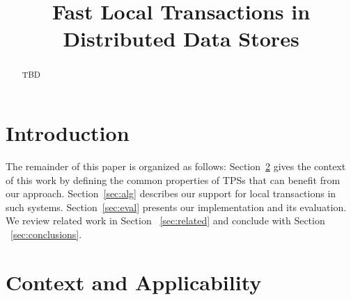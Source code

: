 \documentclass[preprint,10pt]{sigplanconf}
\begin{document}
\title{Fast Local Transactions in Distributed Data Stores}


\maketitle

\sloppy


\begin{abstract}
TBD
\end{abstract}


\section{Introduction} \label{sec:intro}


The remainder of this paper is organized as follows:
Section~\ref{sec:context}  gives the context of this work by defining the common properties of TPSs that can benefit from our approach. 
Section~\ref{sec:alg} describes our support for local transactions in such systems. 
Section~\ref{sec:eval} presents our implementation and its evaluation. 
We review related work in Section ~\ref{sec:related} and conclude with Section ~\ref{sec:conclusions}.

\section{Context and Applicability} \label{sec:context}

\end{document}
